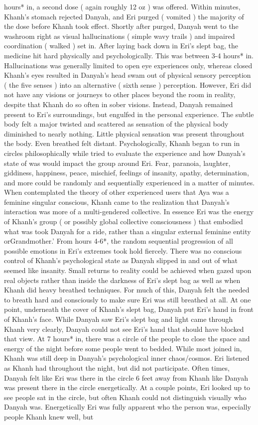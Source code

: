 \documentclass[12pt]{book}
\begin{document}
hours* in, a second dose ( again roughly 12 oz ) was offered. Within minutes, Khanh's stomach rejected Danyah, and Eri purged ( vomited ) the majority of the dose before Khanh took effect. Shortly after purged, Danyah went to the washroom right as visual hallucinations ( simple wavy trails ) and impaired coordination ( walked ) set in. After laying back down in Eri's slept bag, the medicine hit hard physically and psychologically. This was between 3-4 hours* in. Hallucinations was generally limited to open eye experiences only, whereas closed Khanh's eyes resulted in Danyah's head swam out of physical sensory perception ( the five senses ) into an alternative ( sixth sense ) perception. However, Eri did not have any visions or journeys to other places beyond the room in reality, despite that Khanh do so often in sober visions. Instead, Danyah remained present to Eri's surroundings, but engulfed in the personal experience. The subtle body felt a major twisted and scattered as sensation of the physical body diminished to nearly nothing. Little physical sensation was present throughout the body. Even breathed felt distant. Psychologically, Khanh began to run in circles philosophically while tried to evaluate the experience and how Danyah's state of was would impact the group around Eri. Fear, paranoia, laughter, giddiness, happiness, peace, mischief, feelings of insanity, apathy, determination, and more could be randomly and sequentially experienced in a matter of minutes. When contemplated the theory of other experienced users that Aya was a feminine singular conscious, Khanh came to the realization that Danyah's interaction was more of a multi-gendered collective. In essence Eri was the energy of Khanh's group ( or possibly global collective consciousness ) that embodied what was took Danyah for a ride, rather than a singular external feminine entity orGrandmother.' From hours 4-6*, the random sequential progression of all possible emotions in Eri's extremes took hold fiercely. There was no conscious control of Khanh's psychological state as Danyah slipped in and out of what seemed like insanity. Small returns to reality could be achieved when gazed upon real objects rather than inside the darkness of Eri's slept bag as well as when Khanh did heavy breathed techniques. For much of this, Danyah felt the needed to breath hard and consciously to make sure Eri was still breathed at all. At one point, underneath the cover of Khanh's slept bag, Danyah put Eri's hand in front of Khanh's face. While Danyah saw Eri's slept bag and light came through Khanh very clearly, Danyah could not see Eri's hand that should have blocked that view. At 7 hours* in, there was a circle of the people to close the space and energy of the night before some people went to bedded. While most joined in, Khanh was still deep in Danyah's psychological inner chaos/cosmos. Eri listened as Khanh had throughout the night, but did not participate. Often times, Danyah felt like Eri was there in the circle 6 feet away from Khanh like Danyah was present there in the circle energetically. At a couple points, Eri looked up to see people sat in the circle, but often Khanh could not distinguish visually who Danyah was. Energetically Eri was fully apparent who the person was, especially people Khanh knew well, but 
\end{document}
